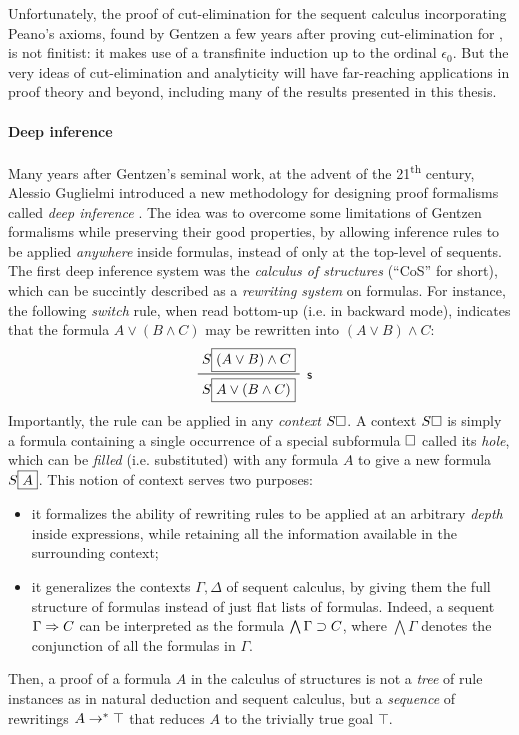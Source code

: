 Unfortunately, the proof of cut-elimination for the sequent calculus
incorporating Peano's axioms, found by Gentzen a few years after proving
cut-elimination for  , is
not finitist: it makes use of a transfinite induction up to the ordinal
$\epsilon_0$. But the very ideas of cut-elimination and analyticity will have
far-reaching applications in proof theory and beyond, including many of the
results presented in this thesis.

\paragraph{Deep inference}

Many years after Gentzen's seminal work, at the advent of the
21\textsuperscript{th} century, Alessio Guglielmi introduced a new methodology
for designing proof formalisms called \emph{deep inference}
. The idea was to overcome some limitations of
Gentzen formalisms while preserving their good properties, by allowing inference
rules to be applied \emph{anywhere} inside formulas, instead of only at the
top-level of sequents. The first deep inference system was
the \emph{calculus of structures} (``CoS'' for short), which can be succintly
described as a \emph{rewriting system} on formulas. For instance, the following
\emph{switch} rule, when read bottom-up (i.e. in backward mode), indicates that
the formula $A \lor (B \land C)$ may be rewritten into $(A \lor B) \land C$:
$$\R[\rsf{s}]{S\select{(A \lor B) \land C}}{S\select{A \lor (B \land C)}}$$
Importantly, the rule can be applied in any \emph{context} $S\square$. A context
$S\square$ is simply a formula containing a single occurrence of a special
subformula $\square$ called its \emph{hole}, which can be \emph{filled} (i.e.
substituted) with any formula $A$ to give a new formula $S\fbox{$A$}$. This
notion of context serves two purposes:
\begin{itemize}
  \item it formalizes the ability of rewriting rules to be applied at an
  arbitrary \emph{depth} inside expressions, while retaining all the information
  available in the surrounding context;
  \item it generalizes the contexts $\Gamma, \Delta$ of sequent calculus, by
  giving them the full structure of formulas instead of just flat lists of
  formulas. Indeed, a sequent $\Gamma \Rightarrow C$ can be interpreted as the formula
  $\bigwedge \Gamma \supset C$, where $\bigwedge \Gamma$ denotes the conjunction
  of all the formulas in $\Gamma$.
\end{itemize}
Then, a proof of a formula $A$ in the calculus of structures is not a
\emph{tree} of rule instances as in natural deduction and sequent calculus, but
a \emph{sequence} of rewritings $A \rightarrow^\ast \top$ that reduces $A$ to the
trivially true goal $\top$.


